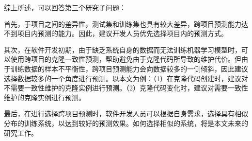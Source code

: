 综上所述，可以回答第三个研究子问题：

首先，于项目之间的差异性，测试集和训练集也具有较大差异，跨项目预测能力达不到项目内预测的能力。因此，建议开发人员优先选择项目内的预测方式。

其次，在软件开发初期，由于缺乏系统自身的数据而无法训练机器学习模型时，可以使用跨项目的克隆一致性预测，帮助避免由于克隆代码所导致的维护代价。但由于训练数据的样本不平衡性，跨项目预测能力会向数据较多的一侧倾斜，因此建议选择数据较多的一个角度进行预测。以本文为例：（1）在克隆代码创建时，建议对不需要一致性维护的克隆实例进行预测。（2）克隆代码变化时，建议对需要一致性维护的克隆实例进行预测。

最后，在进行选择跨项目预测时，软件开发人员可以根据自身需求，选择具有相似分布的训练系统，以达到较好的预测效果。如何选择相似的系统，将是本文未来的研究工作。



